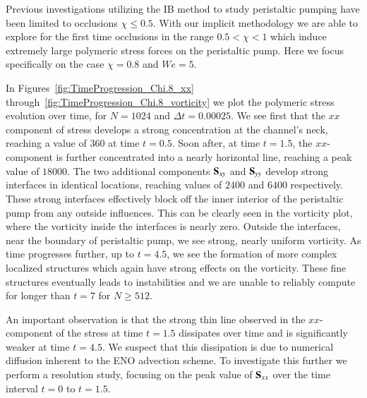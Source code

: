 Previous investigations utilizing the IB method to study peristaltic pumping have been limited to occlusions $\chi \leq 0.5$. With
our implicit methodology we are able to explore for the first time occlusions in the range $0.5 < \chi <1$ which induce extremely large polymeric stress forces  on the peristaltic pump. Here we focus specifically on the case $\chi=0.8$ and $We=5$.

In Figures~\ref{fig:TimeProgression_Chi.8_xx} through~\ref{fig:TimeProgression_Chi.8_vorticity} we plot the polymeric stress evolution over time, for $N=1024$ and $\Delta t=0.00025$. We see first that the $xx$ component of stress develops a strong concentration at the channel's neck, reaching a value of $360$ at time $t=0.5$. Soon after, at time $t=1.5$, the $xx$-component is further concentrated into a nearly horizontal line, reaching a peak value of $18000$. The two additional components $\mathbf{S}_{xy}$ and $\mathbf{S}_{yy}$ develop strong interfaces in identical locations, reaching values of $2400$ and $6400$ respectively. These strong interfaces effectively block off the inner interior of the peristaltic pump from any outside influences. This can be clearly seen in the vorticity plot, where the vorticity inside the interfaces is nearly zero. Outside the interfaces, near the boundary of peristaltic pump, we see strong, nearly uniform vorticity. As time progresses further, up to $t=4.5$, we see the formation of more complex localized structures which again have strong effects on the vorticity. These fine structures eventually leads to instabilities and we are unable to reliably compute for longer than $t=7$ for $N\geq 512$.

An important observation is that the strong thin line observed in the $xx$-component of the stress at time $t=1.5$ dissipates over time and is significantly weaker at time $t=4.5$. We suspect that this dissipation is due to numerical diffusion inherent to the ENO advection scheme. To investigate this further we perform a resolution study, focusing on the peak value of $\mathbf{S}_{xx}$ over the time interval $t=0$ to $t=1.5$.

